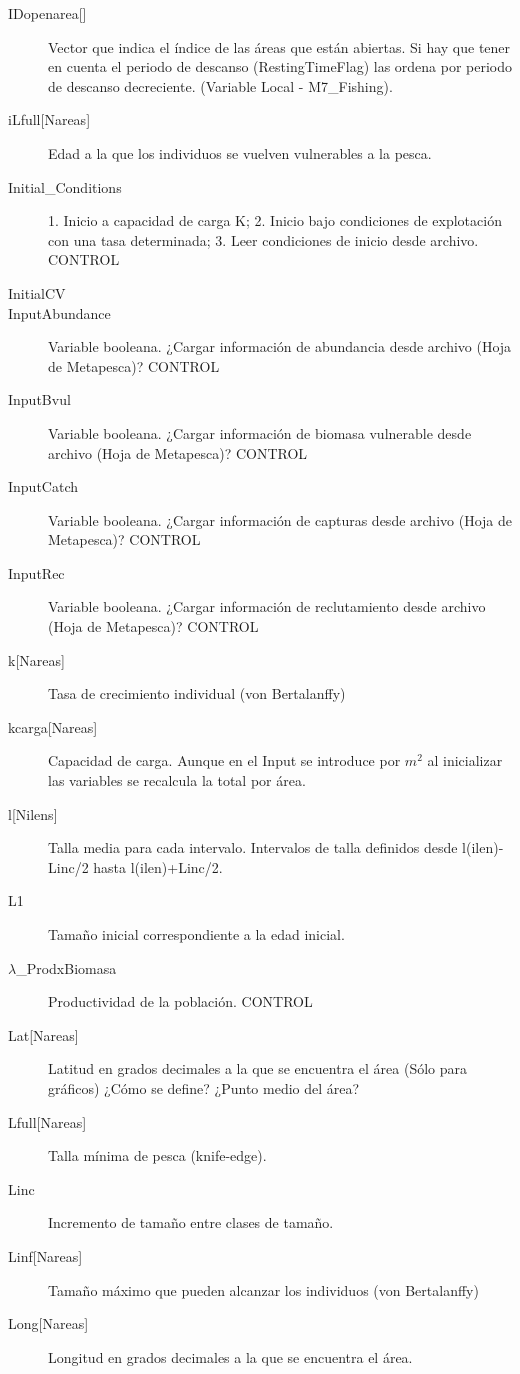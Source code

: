 \documentclass[12pt, oneside, a4paper]{article}
\begin{document}
\begin{description}
		\item[IDopenarea{[}{]}] Vector que indica el índice de las áreas que están abiertas. Si hay que tener en cuenta el periodo de descanso (RestingTimeFlag) las ordena por periodo de descanso decreciente. (Variable Local - M7\_Fishing).
		\item[iLfull{[}Nareas{]}] Edad a la que los individuos se vuelven vulnerables a la pesca. 
		\item[Initial\_Conditions] 1. Inicio a capacidad de carga K; 2. Inicio bajo condiciones de explotación con una tasa determinada; 3. Leer condiciones de inicio desde archivo. CONTROL
		\item[InitialCV]
		\item[InputAbundance] Variable booleana. ¿Cargar información de abundancia desde archivo (Hoja de Metapesca)? CONTROL
		\item[InputBvul] Variable booleana. ¿Cargar información de biomasa vulnerable desde archivo (Hoja de Metapesca)? CONTROL
		\item[InputCatch] Variable booleana. ¿Cargar información de capturas desde archivo (Hoja de Metapesca)? CONTROL
		\item[InputRec] Variable booleana. ¿Cargar información de reclutamiento desde archivo (Hoja de Metapesca)? CONTROL
		
		\item[k{[}Nareas{]}] Tasa de crecimiento individual (von Bertalanffy)
		\item[kcarga{[}Nareas{]}] Capacidad de carga. Aunque en el Input se introduce por $m^2$ al inicializar las variables se recalcula la total por área.
		
		
		\item[l{[}Nilens{]}] Talla media para cada intervalo. Intervalos de talla definidos desde l(ilen)-Linc/2 hasta l(ilen)+Linc/2. 
		\item[L1] Tamaño inicial correspondiente a la edad inicial.
		\item[$\lambda$\_ProdxBiomasa] Productividad de la población. CONTROL
		\item[Lat{[}Nareas{]}] Latitud en grados decimales a la que se encuentra el área (Sólo para gráficos) ¿Cómo se define? ¿Punto medio del área? 
		\item[Lfull{[}Nareas{]}] Talla mínima de pesca (knife-edge).
		\item[Linc] Incremento de tamaño entre clases de tamaño. 
		\item[Linf{[}Nareas{]}] Tamaño máximo que pueden alcanzar los individuos (von Bertalanffy)
		\item[Long{[}Nareas{]}] Longitud en grados decimales a la que se encuentra el área.
		

\end{description}
\end{document}
